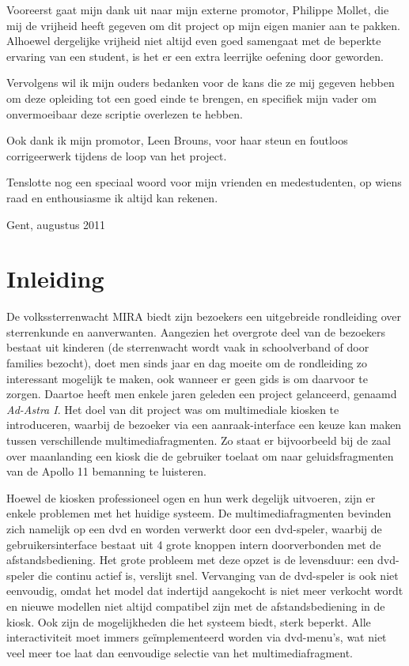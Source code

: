 Vooreerst gaat mijn dank uit naar mijn externe promotor, Philippe Mollet, die mij de vrijheid heeft gegeven om dit project op mijn eigen manier aan te pakken. Alhoewel dergelijke vrijheid niet altijd even goed samengaat met de beperkte ervaring van een student, is het er een extra leerrijke oefening door geworden.

Vervolgens wil ik mijn ouders bedanken voor de kans die ze mij gegeven hebben om deze opleiding tot een goed einde te brengen, en specifiek mijn vader om onvermoeibaar deze scriptie overlezen te hebben.

Ook dank ik mijn promotor, Leen Brouns, voor haar steun en foutloos corrigeerwerk tijdens de loop van het project.

Tenslotte nog een speciaal woord voor mijn vrienden en medestudenten, op wiens raad en enthousiasme ik altijd kan rekenen.

\begin{flushright}
Gent, augustus 2011
\end{flushright} 

\clearpage


%
%

\chapter{Inleiding}
\label{inleiding}

De volkssterrenwacht MIRA biedt zijn bezoekers een uitgebreide rondleiding over sterrenkunde en aanverwanten. Aangezien het overgrote deel van de bezoekers bestaat uit kinderen (de sterrenwacht wordt vaak in schoolverband of door families bezocht), doet men sinds jaar en dag moeite om de rondleiding zo interessant mogelijk te maken, ook wanneer er geen gids is om daarvoor te zorgen. Daartoe heeft men enkele jaren geleden een project gelanceerd, genaamd \emph{Ad-Astra I}. Het doel van dit project was om multimediale kiosken te introduceren, waarbij de bezoeker via een aanraak-interface een keuze kan maken tussen verschillende multimediafragmenten. Zo staat er bijvoorbeeld bij de zaal over maanlanding een kiosk die de gebruiker toelaat om naar geluidsfragmenten van de Apollo 11 bemanning te luisteren.

Hoewel de kiosken professioneel ogen en hun werk degelijk uitvoeren, zijn er enkele problemen met het huidige systeem. De multimediafragmenten bevinden zich namelijk op een \ac{dvd} en worden verwerkt door een \acs{dvd}-speler, waarbij de gebruikersinterface bestaat uit 4 grote knoppen intern doorverbonden met de afstandsbediening.
Het grote probleem met deze opzet is de levensduur: een \acs{dvd}-speler die continu actief is, verslijt snel. Vervanging van de \acs{dvd}-speler is ook niet eenvoudig, omdat het model dat indertijd aangekocht is niet meer verkocht wordt en nieuwe modellen niet altijd compatibel zijn met de afstandsbediening in de kiosk.
Ook zijn de mogelijkheden die het systeem biedt, sterk beperkt. Alle interactiviteit moet immers geïmplementeerd worden via \acs{dvd}-menu's, wat niet veel meer toe laat dan eenvoudige selectie van het multimediafragment.

